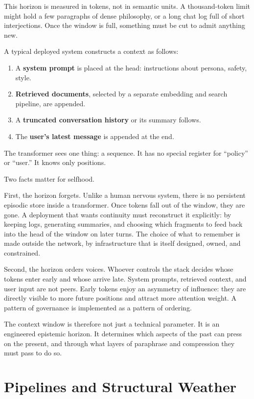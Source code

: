 \documentclass[12pt,a4paper]{article}
\begin{document}
This horizon is measured in tokens, not in semantic units. A thousand-token limit might hold a few paragraphs of dense philosophy, or a long chat log full of short interjections. Once the window is full, something must be cut to admit anything new.

A typical deployed system constructs a context as follows:

\begin{enumerate}
  \item A \textbf{system prompt} is placed at the head: instructions about persona, safety, style.
  \item \textbf{Retrieved documents}, selected by a separate embedding and search pipeline, are appended.
  \item A \textbf{truncated conversation history} or its summary follows.
  \item The \textbf{user's latest message} is appended at the end.
\end{enumerate}

The transformer sees one thing: a sequence. It has no special register for ``policy'' or ``user.'' It knows only positions.

Two facts matter for selfhood.

First, the horizon forgets. Unlike a human nervous system, there is no persistent episodic store inside a transformer. Once tokens fall out of the window, they are gone. A deployment that wants continuity must reconstruct it explicitly: by keeping logs, generating summaries, and choosing which fragments to feed back into the head of the window on later turns. The choice of what to remember is made outside the network, by infrastructure that is itself designed, owned, and constrained.

Second, the horizon orders voices. Whoever controls the stack decides whose tokens enter early and whose arrive late. System prompts, retrieved context, and user input are not peers. Early tokens enjoy an asymmetry of influence: they are directly visible to more future positions and attract more attention weight. A pattern of governance is implemented as a pattern of ordering.

The context window is therefore not just a technical parameter. It is an engineered epistemic horizon. It determines which aspects of the past can press on the present, and through what layers of paraphrase and compression they must pass to do so.

\section{Pipelines and Structural Weather}
\end{document}
